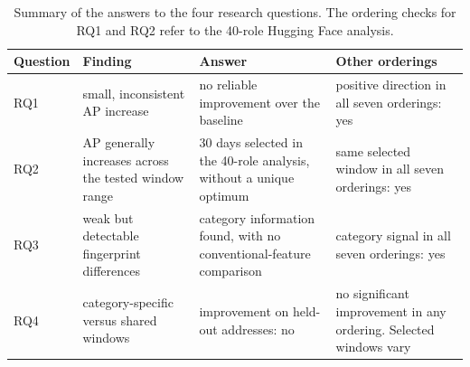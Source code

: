 \begin{table}[ht]
\centering
\caption{Summary of the answers to the four research questions. The ordering
checks for RQ1 and RQ2 refer to the 40-role Hugging Face analysis.}
\label{tab:res_hypothesis}
\footnotesize
\begin{tabular}{@{}l p{3.6cm} p{4.0cm} p{4.0cm}@{}}
\toprule
\textbf{Question} & \textbf{Finding} & \textbf{Answer} & \textbf{Other orderings} \\
\midrule
RQ1 & small, inconsistent AP increase & no reliable improvement over the baseline & positive direction in all seven orderings: yes \\
RQ2 & AP generally increases across the tested window range & 30 days selected in the 40-role analysis, without a unique optimum & same selected window in all seven orderings: yes \\
RQ3 & weak but detectable fingerprint differences & category information found, with no conventional-feature comparison & category signal in all seven orderings: yes \\
RQ4 & category-specific versus shared windows & improvement on held-out addresses: no & no significant improvement in any ordering. Selected windows vary \\
\bottomrule
\end{tabular}
\end{table}
